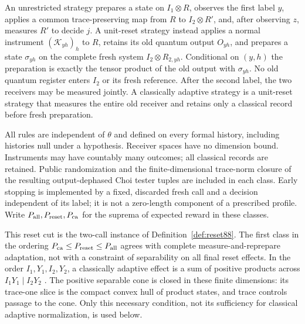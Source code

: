 \begin{definition}\label{def:classes91}
An unrestricted strategy prepares a state on $I_1\otimes R$, observes
the first label $y$, applies a common trace-preserving map from $R$ to
$I_2\otimes R'$, and, after observing $z$, measures $R'$ to decide $j$.
A unit-reset strategy instead applies a normal instrument
$(\mathcal K_{yh})_h$ to $R$, retains its old quantum output $O_{yh}$,
and prepares a state $\sigma_{yh}$ on the complete fresh system
$I_2\otimes R_{2,yh}$.  Conditional on $(y,h)$ the preparation is
exactly the tensor product of the old output with $\sigma_{yh}$.
No old quantum register enters $I_2$ or its fresh reference.  After the
second label, the two receivers may be measured jointly.  A classically
adaptive strategy is a unit-reset strategy that measures the entire old
receiver and retains only a classical record before fresh preparation.

All rules are independent of $\theta$ and defined on every formal
history, including histories null under a hypothesis.  Receiver spaces
have no dimension bound.  Instruments may have countably many outcomes;
all classical records are retained.  Public randomization and the
finite-dimensional trace-norm closure of the resulting output-dephased
Choi tester tuples are included in each class.  Early stopping is
implemented by a fixed, discarded fresh call and a decision independent
of its label; it is not a zero-length component of a prescribed profile.
Write $P_{\rm all},P_{\rm reset},P_{\rm ca}$ for the suprema of expected
reward in these classes.
\end{definition}
This reset cut is the two-call instance of Definition~\ref{def:reset88}.
The first class in the ordering
$P_{\rm ca}\le P_{\rm reset}\le P_{\rm all}$ agrees with complete
measure-and-reprepare adaptation, not with a constraint of separability
on all final reset effects.  In the order $I_1,Y_1,I_2,Y_2$, a
classically adaptive effect is a sum of positive products across
$I_1Y_1\mid I_2Y_2$ \cite[Definition~23]{OZNPQ89}.
The positive separable cone is closed in these finite dimensions:
its trace-one slice is the compact convex hull of product states, and
trace controls passage to the cone.  Only this necessary condition,
not its sufficiency for classical adaptive normalization, is used below.

